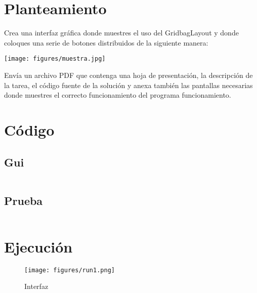 \documentclass[12pt]{article}
\author{Pablo Vargas Bermúdez}
\begin{document}
\pagestyle{empty}



\section*{Planteamiento}
Crea una interfaz gráfica donde muestres el uso del GridbagLayout y
donde coloques una serie de botones distribuidos de la siguiente
manera:

\begin{center}
  \texttt{[image: figures/muestra.jpg]}
\end{center}

Envía un archivo PDF que contenga una hoja de presentación, la
descripción de la tarea, el código fuente de la solución y anexa
también las pantallas necesarias donde muestres el correcto
funcionamiento del programa funcionamiento.

\section*{Código}
\subsection*{Gui}
\inputminted{Java}{Gui.java}
\subsection*{Prueba}
\inputminted{Java}{Prueba.java}

\section*{Ejecución}
\begin{figure}[ht]
  \centering
  \texttt{[image: figures/run1.png]}
  \caption{Interfaz}
\end{figure}
\end{document}
